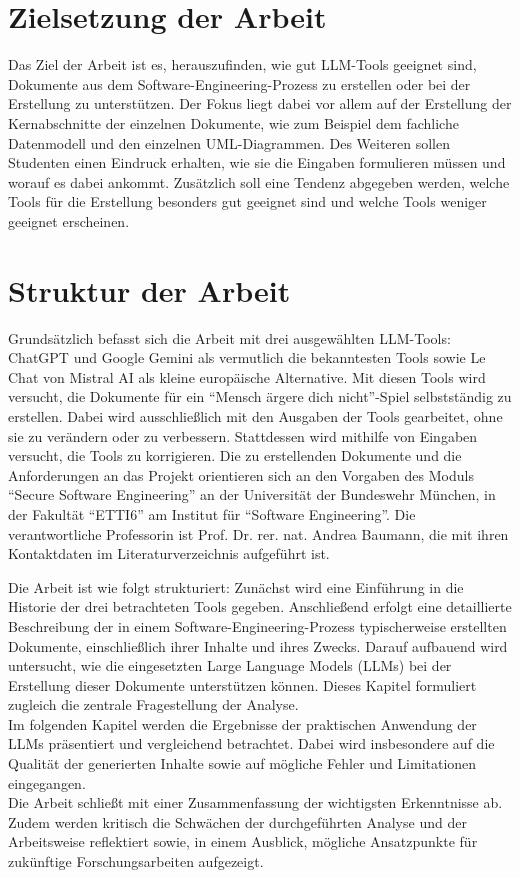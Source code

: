 \section{Zielsetzung der Arbeit}  \label{Zielsetzung der Arbeit}

Das Ziel der Arbeit ist es, herauszufinden, wie gut LLM-Tools geeignet sind, Dokumente aus dem Software-Engineering-Prozess zu 
erstellen oder bei der Erstellung zu unterstützen. Der Fokus liegt dabei vor allem auf der Erstellung der Kernabschnitte der 
einzelnen Dokumente, wie zum Beispiel dem fachliche Datenmodell und den einzelnen UML-Diagrammen. Des Weiteren sollen Studenten 
einen Eindruck erhalten, wie sie die Eingaben formulieren müssen und worauf es dabei ankommt. Zusätzlich soll eine Tendenz 
abgegeben werden, welche Tools für die Erstellung besonders gut geeignet sind und welche Tools weniger geeignet erscheinen. 

\section{Struktur der Arbeit}  \label{Struktur der Arbeit}

Grundsätzlich befasst sich die Arbeit mit drei ausgewählten LLM-Tools: ChatGPT und Google Gemini als vermutlich die 
bekanntesten Tools sowie Le Chat von Mistral AI als kleine europäische Alternative. Mit diesen Tools wird versucht, 
die Dokumente für ein ``Mensch ärgere dich nicht''-Spiel selbstständig zu erstellen. Dabei wird ausschließlich mit den 
Ausgaben der Tools gearbeitet, ohne sie zu verändern oder zu verbessern. Stattdessen wird mithilfe von Eingaben 
versucht, die Tools zu korrigieren. Die zu erstellenden Dokumente und die Anforderungen an das Projekt orientieren 
sich an den Vorgaben des Moduls ``Secure Software Engineering'' an der Universität der Bundeswehr München, in der 
Fakultät ``ETTI6'' am Institut für ``Software Engineering''. Die verantwortliche Professorin ist Prof. Dr. rer. nat. Andrea Baumann, 
die mit ihren Kontaktdaten im Literaturverzeichnis aufgeführt ist.

Die Arbeit ist wie folgt strukturiert: Zunächst wird eine Einführung in die Historie der drei betrachteten Tools gegeben. 
Anschließend erfolgt eine detaillierte Beschreibung der in einem Software-Engineering-Prozess typischerweise erstellten 
Dokumente, einschließlich ihrer Inhalte und ihres Zwecks. Darauf aufbauend wird untersucht, wie die eingesetzten Large 
Language Models (LLMs) bei der Erstellung dieser Dokumente unterstützen können. Dieses Kapitel formuliert zugleich die 
zentrale Fragestellung der Analyse.\\
Im folgenden Kapitel werden die Ergebnisse der praktischen Anwendung der LLMs präsentiert und vergleichend betrachtet. 
Dabei wird insbesondere auf die Qualität der generierten Inhalte sowie auf mögliche Fehler und Limitationen eingegangen.\\
Die Arbeit schließt mit einer Zusammenfassung der wichtigsten Erkenntnisse ab. Zudem werden kritisch die Schwächen der 
durchgeführten Analyse und der Arbeitsweise reflektiert sowie, in einem Ausblick, mögliche Ansatzpunkte für zukünftige Forschungsarbeiten aufgezeigt.

